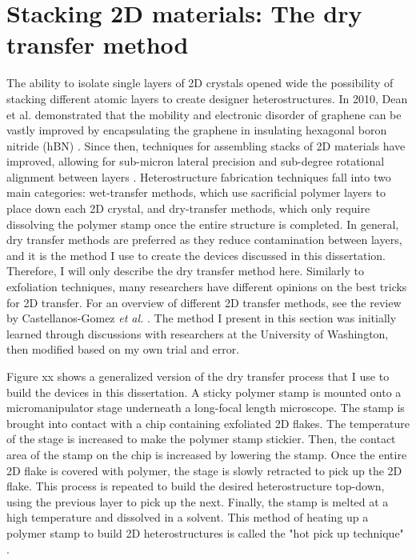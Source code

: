 \documentclass[double,12pt,1in]{beavtex}
\begin{document}
\section{Stacking 2D materials: The dry transfer method}
The ability to isolate single layers of 2D crystals opened wide the possibility of stacking different atomic layers to create designer heterostructures. In 2010, Dean et al. demonstrated that the mobility and electronic disorder of graphene can be vastly improved by encapsulating the graphene in insulating hexagonal boron nitride (hBN) \cite{dean_boron_2010}. Since then, techniques for assembling stacks of 2D materials have improved, allowing for sub-micron lateral precision and sub-degree rotational alignment between layers \cite{castellanos-gomez_van_2022}. Heterostructure fabrication techniques fall into two main categories: wet-transfer methods, which use sacrificial polymer layers to place down each 2D crystal, and dry-transfer methods, which only require dissolving the polymer stamp once the entire structure is completed. In general, dry transfer methods are preferred as they reduce contamination between layers, and it is the method I use to create the devices discussed in this dissertation. Therefore, I will only describe the dry transfer method here. Similarly to exfoliation techniques, many researchers have different opinions on the best tricks for 2D transfer. For an overview of different 2D transfer methods, see the review by Castellanos-Gomez \textit{et al.} \cite{castellanos-gomez_van_2022}. The method I present in this section was initially learned through discussions with researchers at the University of Washington, then modified based on my own trial and error.

Figure xx shows a generalized version of the dry transfer process that I use to build the devices in this dissertation.  A sticky polymer stamp is mounted onto a micromanipulator stage underneath a long-focal length microscope. The stamp is brought into contact with a chip containing exfoliated 2D flakes. The temperature of the stage is increased to make the polymer stamp stickier. Then, the contact area of the stamp on the chip is increased by lowering the stamp. Once the entire 2D flake is covered with polymer, the stage is slowly retracted to pick up the 2D flake. This process is repeated to build the desired heterostructure top-down, using the previous layer to pick up the next. Finally, the stamp is melted at a high temperature and dissolved in a solvent. This method of heating up a polymer stamp to build 2D heterostructures is called the "hot pick up technique" \cite{pizzocchero_hot_2016}.
\end{document}
